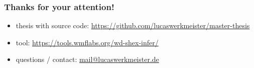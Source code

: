 \documentclass[aspectratio=169]{beamer}
\begin{document}
\begin{frame}
  \frametitle{Thanks for your attention!}
  \begin{itemize}
  \item thesis with source code: \url{https://github.com/lucaswerkmeister/master-thesis}
  \item tool: \url{https://tools.wmflabs.org/wd-shex-infer/}
  \item questions / contact: \href{mailto:mail@lucaswerkmeister.de}{mail@lucaswerkmeister.de}
  \end{itemize}
\end{frame}
\end{document}
